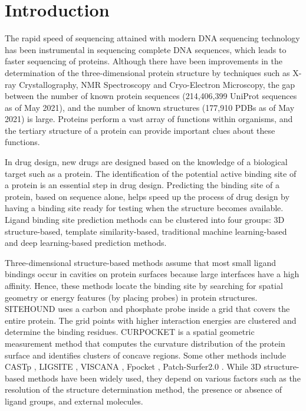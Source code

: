 \documentclass[journal=jacsat,manuscript=article]{achemso}
\begin{document}
\section{Introduction}
\quad The rapid speed of sequencing attained with modern DNA sequencing technology has been instrumental in sequencing complete DNA sequences, which leads to faster sequencing of proteins. Although there have been improvements in the determination of the three-dimensional protein structure by techniques such as X-ray Crystallography, NMR Spectroscopy and Cryo-Electron Microscopy, the gap between the number of known protein sequences (214,406,399 UniProt sequences as of May 2021)\cite{uniprot2021uniprot}, and the number of known structures (177,910 PDBs as of May 2021)\cite{berman2000protein}\cite{burley2021rcsb} is large. Proteins perform a vast array of functions within organisms, and the tertiary structure of a protein can provide important clues about these functions.

In drug design, new drugs are designed based on the knowledge of a biological target such as a protein. The identification of the potential active binding site of a protein is an essential step in drug design. Predicting the binding site of a protein, based on sequence alone, helps speed up the process of drug design by having a binding site ready for testing when the structure becomes available. Ligand binding site prediction methods can be clustered into four groups: 3D structure-based, template similarity-based, traditional machine learning-based and deep learning-based prediction methods.

Three-dimensional structure-based methods assume that most small ligand bindings occur in cavities on protein surfaces because large interfaces have a high affinity. Hence, these methods locate the binding site by searching for spatial geometry or energy features (by placing probes) in protein structures. SITEHOUND \cite{hernandez2009sitehound} uses a carbon and phosphate probe inside a grid that covers the entire protein. The grid points with higher interaction energies are clustered and determine the binding residues. CURPOCKET \cite{liu2020cb} is a spatial geometric measurement method that computes the curvature distribution of the protein surface and identifies clusters of concave regions. Some other methods include CASTp \cite{dundas2006castp}, LIGSITE \cite{hendlich1997ligsite}, VISCANA \cite{amari2006viscana}, Fpocket \cite{le2009fpocket}, Patch-Surfer2.0 \cite{zhu2015large}. While 3D structure-based methods have been widely used, they depend on various factors such as the resolution of the structure determination method, the presence or absence of ligand groups, and external molecules.
\end{document}
